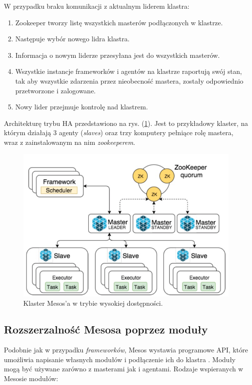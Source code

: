 \documentclass[10pt,a4paper,titlepage,twoside]{report}
\begin{document}
W przypadku braku komunikacji z aktualnym liderem klastra:
\begin{enumerate}
\item Zookeeper tworzy listę wszystkich masterów podłączonych w klastrze.
\item Następuje wybór nowego lidra klastra.
\item Informacja o nowym liderze przesyłana jest do wszystkich masterów.
\item Wszystkie instancje frameworków i agentów na klastrze raportują swój stan, tak aby wszystkie zdarzenia przez nieobecność mastera, zostały odpowiednio przetworzone i zalogowane.
\item Nowy lider przejmuje kontrolę nad klastrem.
\end{enumerate}

Architekturę trybu HA przedstawiono na rys. (\ref{mesos-ha-arch}). Jest to przykładowy klaster, na którym działają 3 agenty (\textit{slaves}) oraz trzy komputery pełniące rolę mastera, wraz z zainstalowanym na nim \textit{zookeeperem}. 
\begin{figure}[!h]
	\centering
	\includegraphics[scale=0.5]{pics/mesos-ha-arch.png}
	\caption{Klaster Mesos'a w trybie wysokiej dostępności.}
	\label{mesos-ha-arch}
\end{figure}

\subsection{Rozszerzalność Mesosa poprzez moduły}

Podobnie jak w przypadku \textit{frameworków}, Mesos wystawia programowe API, które umożliwia napisanie własnych modułów i podłączenie ich do klastra \cite{ad40}. Moduły mogą być używane zarówno z masterami jak i agentami. Rodzaje wspieranych w Mesosie modułów:
\end{document}
